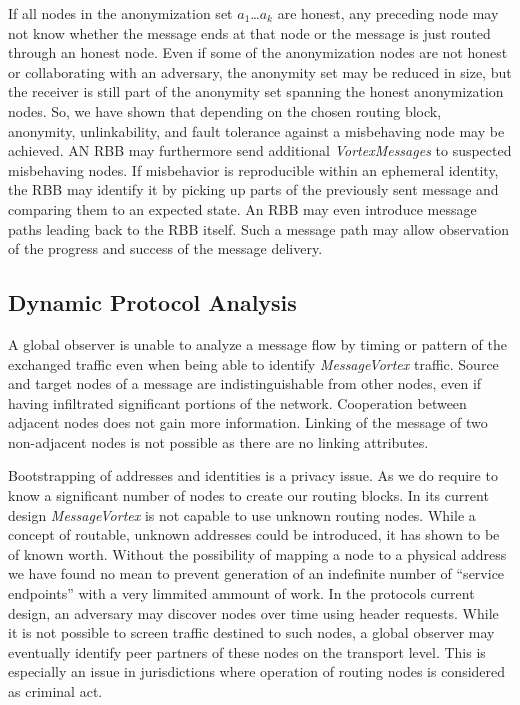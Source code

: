 \documentclass[acmsmall, screen]{acmart}
\begin{document}
If all nodes in the anonymization set $a_1$\ldots$a_k$ are honest, any preceding node may not know whether the message ends at that node or the message is just routed through an honest node. Even if some of the anonymization nodes are not honest or collaborating with an adversary, the anonymity set may be reduced in size, but the receiver is still part of the anonymity set spanning the honest anonymization nodes. So, we have shown that depending on the chosen routing block, anonymity, unlinkability, and fault tolerance against a misbehaving node may be achieved. AN RBB may furthermore send additional \emph{VortexMessages} to suspected misbehaving nodes. If misbehavior is reproducible within an ephemeral identity, the RBB may identify it by picking up parts of the previously sent message and comparing them to an expected state. An RBB may even introduce message paths leading back to the RBB itself. Such a message path may allow observation of the progress and success of the message delivery.

\subsection{Dynamic Protocol Analysis\label{sec:dynamicAnalysis}}
A global observer is unable to analyze a message flow by timing or pattern of the exchanged traffic even when being able to identify \emph{MessageVortex} traffic. Source and target nodes of a message are indistinguishable from other nodes, even if having infiltrated significant portions of the network. Cooperation between adjacent nodes does not gain more information. Linking of the message of two non-adjacent nodes is not possible as there are no linking attributes.

Bootstrapping of addresses and identities is a privacy issue. As we do require to know a significant number of nodes to create our routing blocks. In its current design \emph{MessageVortex} is not capable to use unknown routing nodes. While a concept of routable, unknown addresses could be introduced, it has shown to be of known worth. Without the possibility of mapping a node to a physical address we have found no mean to prevent generation of an indefinite number of ``service endpoints'' with a very limmited ammount of work. In the protocols current design, an adversary may discover nodes over time using header requests. While it is not possible to screen traffic destined to such nodes, a global observer may eventually identify peer partners of these nodes on the transport level. This is especially an issue in jurisdictions where operation of routing nodes is considered as criminal act. 
\end{document}
